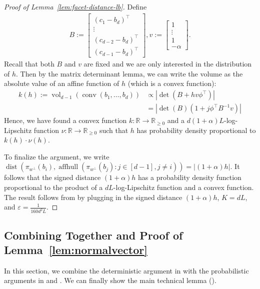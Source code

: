 \documentclass{theoretics}
\newcommand{\R}{\mathbb R}
\newcommand{\aff}{\operatorname{affhull}}
\newcommand{\eps}{\varepsilon} %
\newcommand{\conv}{\operatorname{conv}}
\newcommand{\dist}{\operatorname{dist}}
\newcommand{\vol}{\operatorname{vol}}
\begin{document}
\begin{proof}[Proof of Lemma~\ref{lem:facet-distance-lb}]
    Define
    \begin{align*}
        B := \begin{bmatrix}
            (c_1 - b_d)^\top \\
            \vdots \\
            (c_{d-2} - b_d)^\top \\
            (c_{d-1} - b_d)^\top
        \end{bmatrix} ,
        v := \begin{bmatrix} 1 \\ \vdots \\ 1 \\ -\alpha
        \end{bmatrix}.
    \end{align*}
    Recall that both $B$ and $v$ are fixed and we are only interested in the distribution of $h$.
    Then by the matrix determinant lemma, we can write the volume as the absolute value of an affine function of $h$ (which is a convex function):
    \begin{align*}
        k(h):=\vol_{d-1}(\conv(b_1, \ldots, b_d)) &\propto \left|\det(B + h v\phi^\top) \right| \\
        &= \left| \det(B)(1 + j \phi^\top B^{-1} v) \right|
    \end{align*}
    Hence, we have found a convex function $k : \R \to \R_{\geq 0}$
    and a $d(1+\alpha)L$-log-Lipschitz function $\nu : \R \to \R_{\geq 0}$
    such that $h$ has probability density proportional to
    $k(h) \cdot \nu(h)$.

    To finalize the argument, we write
    $\dist(\pi_{w^\perp}(b_i), \aff(\pi_{w^\perp}(b_j) : j \in [d-1], j \neq i)) = |(1+\alpha)h|$.
    It follows that the signed distance $(1+\alpha)h$ has a probability density function
    proportional to the product of a $dL$-log-Lipschitz function
    and a convex function. The result follows from 
    by plugging in the signed distance $(1+\alpha)h$, $K = dL$, and $\eps = \frac{1}{160 d^2 L}$.
\end{proof}





\subsection{Combining Together and Proof of Lemma~\ref{lem:normalvector}}\label{sub:combine}

In this section, we combine the deterministic argument in  with the probabilistic arguments in  and . We can finally show the main technical lemma ().
\end{document}
